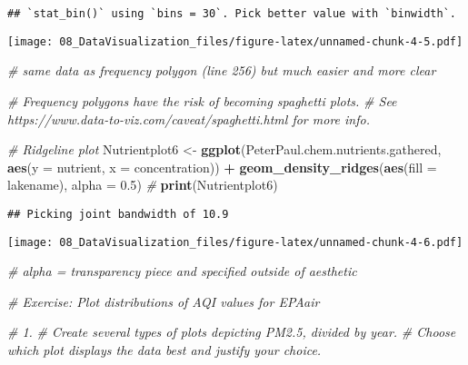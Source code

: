 \documentclass[]{article}
\newenvironment{Shaded}{\begin{snugshade}}{\end{snugshade}}
\newcommand{\KeywordTok}[1]{\textcolor[rgb]{0.13,0.29,0.53}{\textbf{#1}}}
\newcommand{\DataTypeTok}[1]{\textcolor[rgb]{0.13,0.29,0.53}{#1}}
\newcommand{\FloatTok}[1]{\textcolor[rgb]{0.00,0.00,0.81}{#1}}
\newcommand{\StringTok}[1]{\textcolor[rgb]{0.31,0.60,0.02}{#1}}
\newcommand{\CommentTok}[1]{\textcolor[rgb]{0.56,0.35,0.01}{\textit{#1}}}
\newcommand{\OperatorTok}[1]{\textcolor[rgb]{0.81,0.36,0.00}{\textbf{#1}}}
\newcommand{\NormalTok}[1]{#1}
\begin{document}
\begin{verbatim}
## `stat_bin()` using `bins = 30`. Pick better value with `binwidth`.
\end{verbatim}

\texttt{[image: 08\_DataVisualization\_files/figure-latex/unnamed-chunk-4-5.pdf]}

\begin{Shaded}
\begin{Highlighting}[]
\CommentTok{# same data as frequency polygon (line 256) but much easier and more clear}

\CommentTok{# Frequency polygons have the risk of becoming spaghetti plots. }
\CommentTok{# See https://www.data-to-viz.com/caveat/spaghetti.html for more info.}

\CommentTok{# Ridgeline plot}
\NormalTok{Nutrientplot6 <-}
\StringTok{  }\KeywordTok{ggplot}\NormalTok{(PeterPaul.chem.nutrients.gathered, }\KeywordTok{aes}\NormalTok{(}\DataTypeTok{y =}\NormalTok{ nutrient, }\DataTypeTok{x =}\NormalTok{ concentration)) }\OperatorTok{+}
\StringTok{  }\KeywordTok{geom_density_ridges}\NormalTok{(}\KeywordTok{aes}\NormalTok{(}\DataTypeTok{fill =}\NormalTok{ lakename), }\DataTypeTok{alpha =} \FloatTok{0.5}\NormalTok{) }\CommentTok{#}
\KeywordTok{print}\NormalTok{(Nutrientplot6)}
\end{Highlighting}
\end{Shaded}

\begin{verbatim}
## Picking joint bandwidth of 10.9
\end{verbatim}

\texttt{[image: 08\_DataVisualization\_files/figure-latex/unnamed-chunk-4-6.pdf]}

\begin{Shaded}
\begin{Highlighting}[]
\CommentTok{# alpha = transparency piece and specified outside of aesthetic}

\CommentTok{# Exercise: Plot distributions of AQI values for EPAair}

\CommentTok{# 1. }
\CommentTok{# Create several types of plots depicting PM2.5, divided by year. }
\CommentTok{# Choose which plot displays the data best and justify your choice. }
\end{Highlighting}
\end{Shaded}
\end{document}
